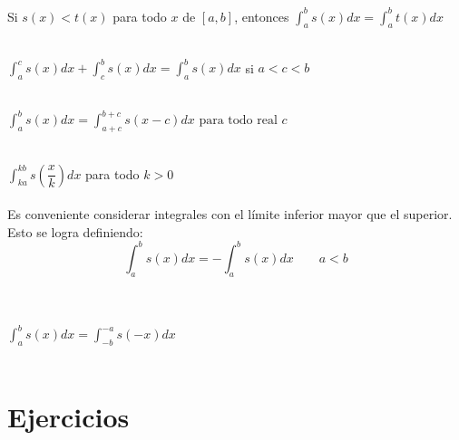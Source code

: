     \begin{teo} Si $s(x)<t(x)$ para todo $x$ de $[a,b]$, entonces $\displaystyle\int_{a}^{b} s(x) dx = \int_{a}^{b} t(x) dx$\\\\
    \end{teo}

    \begin{teo}
	$\displaystyle\int_{a}^{c} s(x) dx +  \int_{c}^{b} s(x) dx = \int_{a}^{b} s(x) dx$  si $a<c<b$ \\\\
    \end{teo}

    \begin{teo} 
	$\displaystyle\int_{a}^{b} s(x) dx = \int_{a+c}^{b+c} s(x-c) dx \mbox{ para todo real } c$\\\\
    \end{teo}

    \begin{teo}
	$\displaystyle\int_{ka}^{kb} s\left(\dfrac{x}{k}\right) dx$ para todo $k>0$\\\\
	Es conveniente considerar integrales con el límite inferior mayor que el superior. Esto se logra definiendo: $$\displaystyle\int_{a}^{b} s(x) dx = - \int_{a}^{b} s(x) dx \qquad a<b$$\\\\
    \end{teo}

    \begin{teo}
	$\displaystyle\int_{a}^{b} s(x) dx = \int_{-b}^{-a} s(-x) dx$\\\\
    \end{teo}

\setcounter{section}{14}
\section{Ejercicios}

